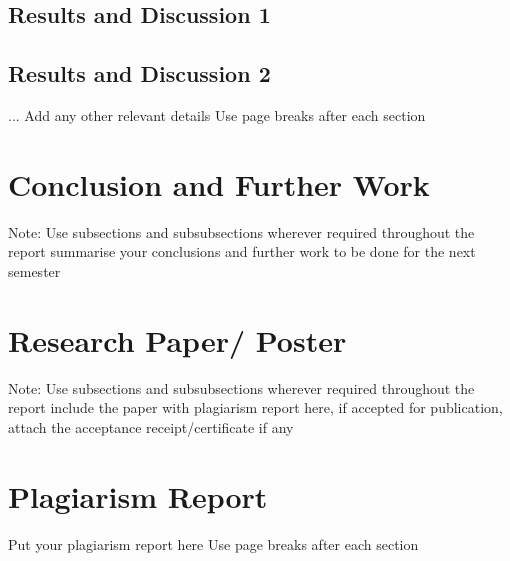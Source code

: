 \documentclass[12pt,singleside,a4paper]{article}
\begin{document}
\subsection{Results and Discussion 1}
\subsection{Results and Discussion 2}
...
\newline Add any other relevant details
\newline Use page breaks after each section

\section{Conclusion and Further Work}
 Note: Use subsections and subsubsections wherever required throughout the report
summarise your conclusions and further work to be done for the next semester
\section{Research Paper/ Poster}
 Note: Use subsections and subsubsections wherever required throughout the report
include the paper with plagiarism report here, if accepted for publication, attach the acceptance receipt/certificate if any
\section{Plagiarism Report}
Put your plagiarism report here
\newline Use page breaks after each section
\end{document}
